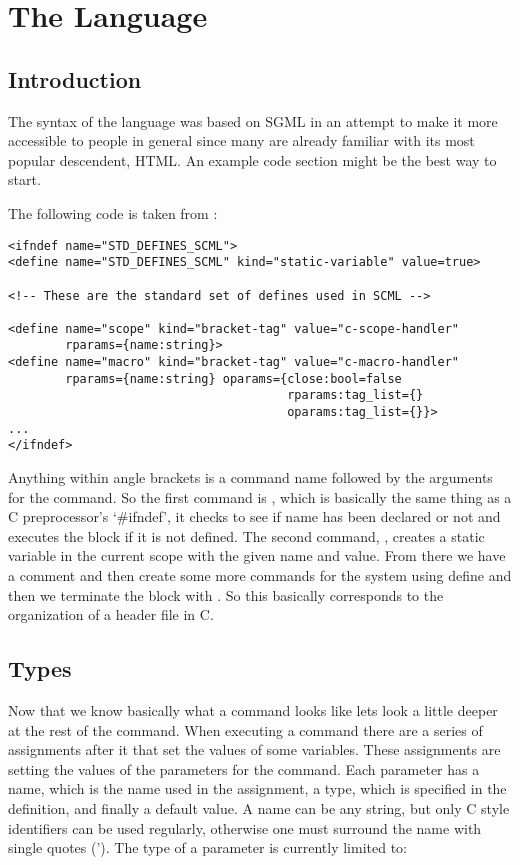 \section{The Language}

\subsection{Introduction}

The syntax of the language was based on SGML in an attempt to make it more
accessible to people in general since many are already familiar with its most
popular descendent, HTML\@.  An example code section might be the best way to
start.

The following \SCML{} code is taken from
:

\begin{verbatim}
<ifndef name="STD_DEFINES_SCML">
<define name="STD_DEFINES_SCML" kind="static-variable" value=true>

<!-- These are the standard set of defines used in SCML -->

<define name="scope" kind="bracket-tag" value="c-scope-handler"
        rparams={name:string}>
<define name="macro" kind="bracket-tag" value="c-macro-handler"
        rparams={name:string} oparams={close:bool=false
                                       rparams:tag_list={}
                                       oparams:tag_list={}}>
...
</ifndef>
\end{verbatim}

Anything within angle brackets is a command name followed by the arguments
for the command.  So the first command is , which is
basically the same thing as a C preprocessor's `\#ifndef', it checks to see if
name has been declared or not and executes the block if it is not defined.  The
second command, , creates a static variable in the
current scope with the given name and value.  From there we have a comment
and then create some more commands for the system using define and then we
terminate the  block with .   So this
basically corresponds to the organization of a header file in C.

\subsection{Types}

Now that we know basically what a command looks like lets look a little deeper
at the rest of the command.  When executing a command there are a series of
assignments after it that set the values of some variables.  These assignments
are setting the values of the parameters for the command.  Each parameter has a
name, which is the name used in the assignment, a type, which is specified in
the definition, and finally a default value. A name can be any string, but only
C style identifiers can be used regularly, otherwise one must surround the name
with single quotes (').  The type of a parameter is currently limited to:

